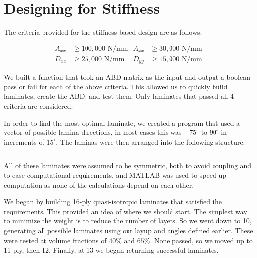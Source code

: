 \documentclass[12pt]{article}
\begin{document}
\section{Designing for Stiffness}

The criteria provided for the stiffness based design are as follows:

\begin{equation}
  \begin{aligned}
    A_{xx} &\geq 100,000 \text{ N/mm} & A_{\overline{xx}} &\geq 30,000 \text{ N/mm} \\ %
    D_{xx} &\geq 25,000 \text{ N/mm} & D_{yy} &\geq 15,000 \text{ N/mm}
    \label{eq:stiffness}
  \end{aligned}
\end{equation}


We built a function that took an ABD matrix as the input and output a boolean pass or fail for each of the above criteria. This allowed us to quickly build laminates, create the ABD, and test them. Only laminates that passed all 4 criteria are considered.

In order to find the most optimal laminate, we created a program that used a vector of possible lamina directions, in most cases this was $-75^\circ$ to $90^\circ$ in increments of $15^\circ$. The laminas were then arranged into the following structure:

\begin{equation*}
    [\theta _1 / \theta_2/\theta_3/ .../\theta_3/\theta_2/\theta_1]
\end{equation*}

All of these laminates were assumed to be symmetric, both to avoid coupling and to ease computational requirements, and MATLAB  was used to speed up computation as none of the calculations depend on each other. 

We began by building 16-ply quasi-isotropic laminates that satisfied the requirements. This provided an idea of where we should start. The simplest way to minimize the weight is to reduce the number of layers. So we went down to 10, generating all possible laminates using our layup and angles defined earlier. These were tested at volume fractions of $40 \%$ and $65 \%$. None passed, so we moved up to 11 ply, then 12. Finally, at 13 we began returning successful laminates. 
\end{document}
